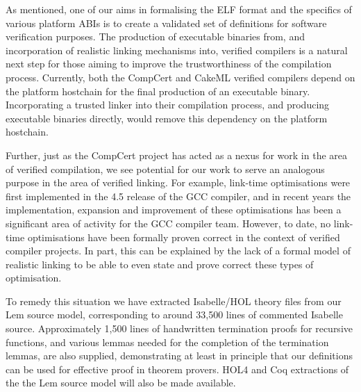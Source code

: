 As mentioned, one of our aims in formalising the ELF format and the specifics of various platform ABIs is to create a validated set of definitions for software verification purposes.
The production of executable binaries from, and incorporation of realistic linking mechanisms into, verified compilers is a natural next step for those aiming to improve the trustworthiness of the compilation process.
Currently, both the CompCert and CakeML verified compilers depend on the platform hostchain for the final production of an executable binary.
Incorporating a trusted linker into their compilation process, and producing executable binaries directly, would remove this dependency on the platform hostchain.

Further, just as the CompCert project has acted as a nexus for work in the area of verified compilation, we see potential for our work to serve an analogous purpose in the area of verified linking.
For example, link-time optimisations were first implemented in the 4.5 release of the GCC compiler, and in recent years the implementation, expansion and improvement of these optimisations has been a significant area of activity for the GCC compiler team.
However, to date, no link-time optimisations have been formally proven correct in the context of verified compiler projects.
In part, this can be explained by the lack of a formal model of realistic linking to be able to even state and prove correct these types of optimisation.

To remedy this situation we have extracted Isabelle/HOL theory files from our Lem source model, corresponding to around 33,500 lines of commented Isabelle source.
Approximately 1,500 lines of handwritten termination proofs for recursive functions, and various lemmas needed for the completion of the termination lemmas, are also supplied, demonstrating at least in principle that our definitions can be used for effective proof in theorem provers.
HOL4 and Coq extractions of the the Lem source model will also be made available.
